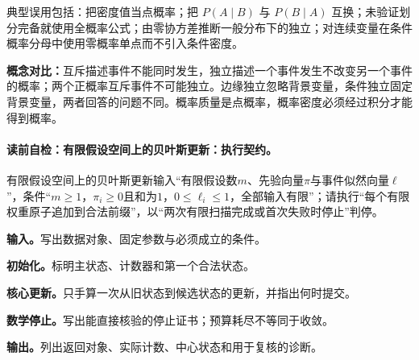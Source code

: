 \begin{warningbox}
典型误用包括：把密度值当点概率；把 $P(A\mid B)$ 与 $P(B\mid A)$ 互换；未验证划分完备就使用全概率公式；由零协方差推断一般分布下的独立；对连续变量在条件概率分母中使用零概率单点而不引入条件密度。
\end{warningbox}

\label{struct:V1-C04-CH33}
\begin{comparisonbox}
\textbf{概念对比：}互斥描述事件不能同时发生，独立描述一个事件发生不改变另一个事件的概率；两个正概率互斥事件不可能独立。边缘独立忽略背景变量，条件独立固定背景变量，两者回答的问题不同。概率质量是点概率，概率密度必须经过积分才能得到概率。
\end{comparisonbox}

\paragraph{读前自检：有限假设空间上的贝叶斯更新：执行契约。}有限假设空间上的贝叶斯更新输入“有限假设数$m$、先验向量$\pi$与事件似然向量$\ell$”，条件“$m\ge1$，$\pi_i\ge0$且和为$1$，$0\le\ell_i\le1$，全部输入有限”；请执行“每个有限权重原子追加到合法前缀”，以“两次有限扫描完成或首次失败时停止”判停。\par
\begin{keypointbox}[title={有限假设空间上的贝叶斯更新：五步阅读}]
\textbf{输入。}写出数据对象、固定参数与必须成立的条件。\par
\textbf{初始化。}标明主状态、计数器和第一个合法状态。\par
\textbf{核心更新。}只手算一次从旧状态到候选状态的更新，并指出何时提交。\par
\textbf{数学停止。}写出能直接核验的停止证书；预算耗尽不等同于收敛。\par
\textbf{输出。}列出返回对象、实际计数、中心状态和用于复核的诊断。
\end{keypointbox}

